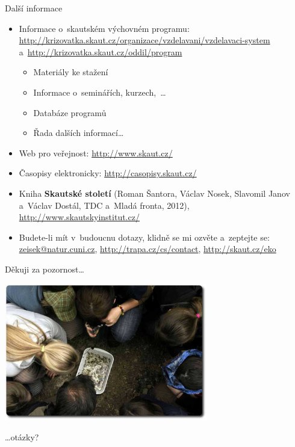 \documentclass[hyperref={bookmarks=true, unicode=true, colorlinks=true, plainpages=false, pdfkeywords={Skaut, Junak, Skauting, Vychovna metoda}, linkcolor=OrangeRed, anchorcolor=OrangeRed, citecolor=RawSienna, filecolor=RawSienna, menucolor=OrangeRed, urlcolor=RawSienna, pdftex}, compress, xelatex, xcolor=dvipsnames, print]{beamer}
\begin{document}
\begin{frame}{Další informace}
\begin{itemize}
\item Informace o~skautském výchovném programu: \href{http://krizovatka.skaut.cz/organizace/vzdelavani/vzdelavaci-system}{http://krizovatka.skaut.cz/organizace/vzdelavani/vzdelavaci-system} a~\href{http://krizovatka.skaut.cz/oddil/program}{http://krizovatka.skaut.cz/oddil/program}
 \begin{itemize}
 \item Materiály ke stažení
 \item Informace o~seminářích, kurzech,~\ldots
 \item Databáze programů
 \item Řada dalších informací\ldots
 \end{itemize}
\item Web pro veřejnost: \href{http://www.skaut.cz/}{http://www.skaut.cz/}
\item Časopisy elektronicky: \href{http://casopisy.skaut.cz/}{http://casopisy.skaut.cz/}
\item Kniha \textbf{Skautské století} (Roman Šantora, Václav Nosek, Slavomil Janov a~Václav Dostál, TDC a~Mladá fronta, 2012), \href{http://www.skautskyinstitut.cz/}{http://www.skautskyinstitut.cz/}
\item Budete-li mít v~budoucnu dotazy, klidně se mi ozvěte a~zeptejte se: \href{mailto:zeisek@natur.cuni.cz}{zeisek@natur.cuni.cz}, \href{http://trapa.cz/cs/contact}{http://trapa.cz/cs/contact}, \href{http://krizovatka.skaut.cz/organizace/instituce-organy/ustredni-organy/odbory/odbory-ekoodbor}{http://skaut.cz/eko}
\end{itemize}
\end{frame}

\begin{frame}{Děkuji za pozornost\ldots}
\begin{center}
\includegraphics[height=6cm]{zaver.jpg}
\end{center}
\begin{flushright}
\begin{large}\ldots otázky?\end{large}
\end{flushright}
\end{frame}
\end{document}
